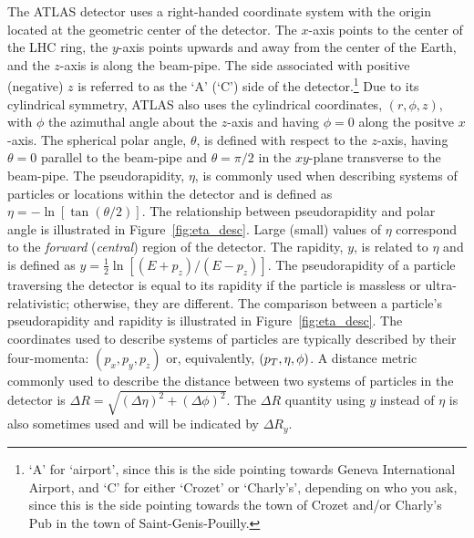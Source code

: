The ATLAS detector uses a right-handed coordinate system with the origin located at
the geometric center of the detector.
The $x$-axis points to the center of the LHC ring, the $y$-axis points upwards
and away from the center of the Earth, and the $z$-axis is along the beam-pipe.
The side associated with positive (negative) $z$
is referred to as the `A' (`C') side of the detector.\footnote{`A' for `airport',
since this is the side pointing towards Geneva International Airport, and
`C' for either `Crozet' or `Charly's', depending on who you ask, since this is the side
pointing towards the town of Crozet and/or Charly's Pub in the town of Saint-Genis-Pouilly.}
Due to its cylindrical symmetry, ATLAS also uses the cylindrical coordinates, $(r,\phi, z)$,
with $\phi$ the azimuthal angle about the $z$-axis and having $\phi = 0$ along the positve $x$-axis.
The spherical polar angle, $\theta$, is defined with respect to the $z$-axis, having
$\theta = 0$ parallel to the beam-pipe and $\theta = \pi/2$ in the $xy$-plane transverse
to the beam-pipe.
The pseudorapidity, $\eta$, is commonly used when describing systems of particles or locations within
the detector and is defined as $\eta = - \ln \left[ \tan \left( \theta / 2 \right) \right ]$.
The relationship between pseudorapidity and polar angle is illustrated in Figure~\ref{fig:eta_desc}.
Large (small) values of $\eta$ correspond to the \textit{forward} (\textit{central}) region of the detector.
The rapidity, $y$, is related to $\eta$ and is defined as $y = \frac{1}{2} \ln \left[ (E+p_z) / (E-p_z) \right]$.
The pseudorapidity of a particle traversing the detector is equal to its rapidity if
the particle is massless or ultra-relativistic; otherwise, they are different.
The comparison between a particle's pseudorapidity and rapidity is illustrated in
Figure~\ref{fig:eta_desc}.
The coordinates used to describe systems of particles are typically described by their
four-momenta: $(p_x, p_y, p_z)$ or, equivalently, $(p_{T}, \eta, \phi)$.
A distance metric commonly used to describe the distance between two systems of particles
in the detector is $\Delta R = \sqrt{ (\Delta \eta)^2 + (\Delta \phi)^2 }$. The
$\Delta R$ quantity using $y$ instead of $\eta$ is also sometimes used and will be
indicated by $\Delta R_y$.


